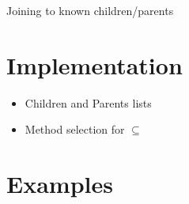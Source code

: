 Joining to known children/parents

\section{Implementation}
\label{sec:lattice-implementation}
\begin{itemize}
\item Children and Parents lists
\item Method selection for $\subseteq$
\end{itemize}

\section{Examples}
\label{sec:lattice-examples}
